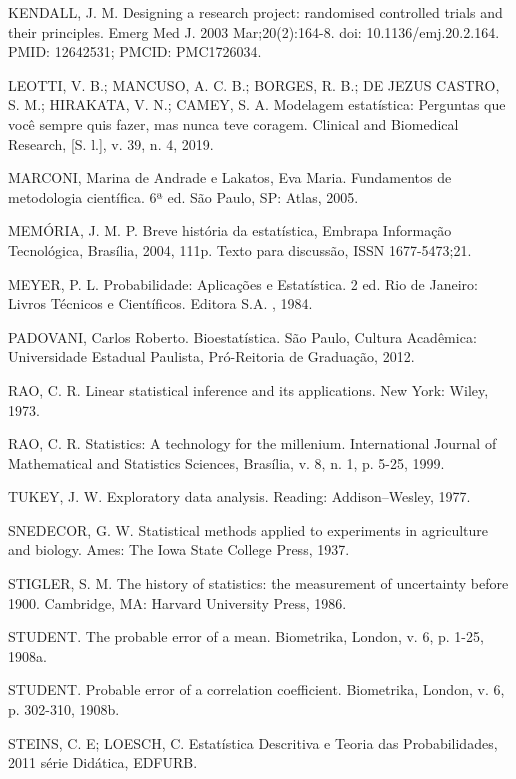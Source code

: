 KENDALL, J. M. Designing a research project: randomised controlled trials and their principles. Emerg Med J. 2003 Mar;20(2):164-8. doi: 10.1136/emj.20.2.164. PMID: 12642531; PMCID: PMC1726034.\vskip0.3cm



LEOTTI, V. B.; MANCUSO, A. C. B.; BORGES, R. B.; DE JEZUS CASTRO, S. M.; HIRAKATA, V. N.; CAMEY, S. A. Modelagem estatística: Perguntas que você sempre quis fazer, mas nunca teve coragem. Clinical and Biomedical Research, [S. l.], v. 39, n. 4, 2019.\vskip0.3cm


MARCONI, Marina de Andrade e Lakatos, Eva Maria. Fundamentos de metodologia científica. 6ª ed. São Paulo, SP: Atlas, 2005.\vskip0.3cm

MEMÓRIA, J. M. P. Breve história da estatística, Embrapa Informação Tecnológica, Brasília, 2004, 111p. Texto para discussão, ISSN 1677-5473;21. \vskip0.3cm

MEYER, P. L. Probabilidade: Aplicações e Estatística. 2 ed.
Rio de Janeiro: Livros Técnicos e Científicos. Editora S.A. ,
1984.\vskip0.3cm


PADOVANI, Carlos Roberto. Bioestatística. São Paulo, Cultura Acadêmica:
Universidade Estadual Paulista, Pró-Reitoria de Graduação, 2012.\vskip0.3cm

RAO, C. R. Linear statistical inference and its applications. New York: Wiley, 1973.\vskip0.3cm

RAO, C. R. Statistics: A technology for the millenium. International Journal of Mathematical and Statistics Sciences, Brasília, v. 8, n. 1, p. 5-25, 1999.\vskip0.3cm

TUKEY, J. W. Exploratory data analysis. Reading: Addison–Wesley, 1977.\vskip0.3cm

SNEDECOR, G. W. Statistical methods applied to experiments in agriculture and biology. Ames: The Iowa State College Press, 1937. \vskip0.3cm

STIGLER, S. M. The history of statistics: the measurement of uncertainty before 1900. Cambridge, MA: Harvard University Press, 1986. \vskip0.3cm

STUDENT. The probable error of a mean. Biometrika, London, v. 6, p. 1-25, 1908a.\vskip0.3cm

STUDENT. Probable error of a correlation coefficient. Biometrika, London, v. 6, p. 302-310, 1908b.\vskip0.3cm

STEINS, C. E; LOESCH, C. Estatística Descritiva e Teoria das Probabilidades, 2011 série Didática, EDFURB.\vskip0.3cm

